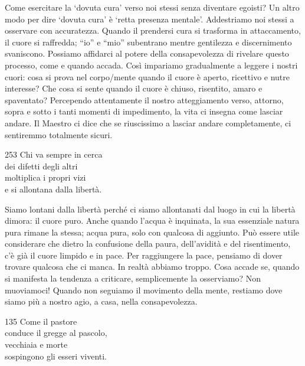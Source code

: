 \begin{dhpRefl}
Come esercitare la `dovuta cura' verso noi stessi senza diventare egoisti? Un altro modo per dire `dovuta cura' \`{e} `retta presenza mentale'. Addestriamo noi stessi a osservare con accuratezza. Quando il prendersi cura si trasforma in attaccamento, il cuore si raffredda; ``io'' e ``mio'' subentrano mentre gentilezza e discernimento svaniscono. Possiamo affidarci al potere della consapevolezza di rivelare questo processo, come e quando accada. Così impariamo gradualmente a leggere i nostri cuori: cosa si prova nel corpo/mente quando il cuore \`{e} aperto, ricettivo e nutre interesse? Che cosa si sente quando il cuore \`{e} chiuso, risentito, amaro e spaventato? Percependo attentamente il nostro atteggiamento verso, attorno, sopra e sotto i tanti momenti di impedimento, la vita ci insegna come lasciar andare. Il Maestro ci dice che se riuscissimo a lasciar andare completamente, ci sentiremmo totalmente sicuri.
\end{dhpRefl}


\begin{dhpVerse}{253}
\label{dhp-253}
Chi va sempre in cerca\\
dei difetti degli altri\\
moltiplica i propri vizi\\
e si allontana dalla libert\`{a}.
\end{dhpVerse}

\begin{dhpRefl}
Siamo lontani dalla libert\`{a} perch\'{e} ci siamo allontanati dal luogo in cui la libert\`{a} dimora: il cuore puro. Anche quando l'acqua \`{e} inquinata, la sua essenziale natura pura rimane la stessa; acqua pura, solo con qualcosa di aggiunto. Pu\`{o} essere utile considerare che dietro la confusione della paura, dell'avidit\`{a} e del risentimento, c'\`{e} gi\`{a} il cuore limpido e in pace. Per raggiungere la pace, pensiamo di dover trovare qualcosa che ci manca. In realt\`{a} abbiamo troppo. Cosa accade se, quando si manifesta la tendenza a criticare, semplicemente la osserviamo? Non muoviamoci! Quando non seguiamo il movimento della mente, restiamo dove siamo più a nostro agio, a casa, nella consapevolezza.
\end{dhpRefl}


\begin{dhpVerse}{135}
\label{dhp-135}
Come il pastore\\
conduce il gregge al pascolo,\\
vecchiaia e morte\\
sospingono gli esseri viventi.
\end{dhpVerse}

